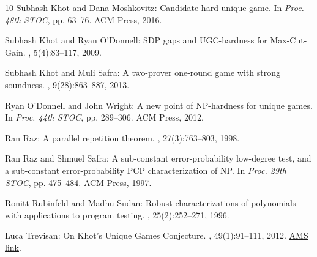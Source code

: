\documentclass[11pt]{article}
\numberwithin{equation}{section}
\theoremstyle{definition}
\theoremstyle{plain}
\begin{document}
\begin{thebibliography}{10}
{\sc Subhash Khot and Dana Moshkovitz}: Candidate hard unique game.
\newblock In {\em Proc. 48th STOC}, pp. 63--76. ACM Press, 2016.
\newblock [\epfmtdoi{10.1145/2897518.2897531}]

{\sc Subhash Khot and Ryan O'Donnell}: {SDP} gaps and {UGC}-hardness for
  {Max-Cut-Gain}.
, 5(4):83--117, 2009.

{\sc Subhash Khot and Muli Safra}: A two-prover one-round game with strong
  soundness.
, 9(28):863--887, 2013.

{\sc Ryan O'Donnell and John Wright}: A new point of {NP}-hardness for unique
  games.
\newblock In {\em Proc. 44th STOC}, pp. 289--306. ACM Press, 2012.
\newblock [\epfmtdoi{10.1145/2213977.2214005}]

{\sc Ran Raz}: A parallel repetition theorem.
, 27(3):763--803, 1998.
\newblock [\epfmtdoi{10.1137/S0097539795280895}]

{\sc Ran Raz and Shmuel Safra}: A sub-constant error-probability low-degree
  test, and a sub-constant error-probability {PCP} characterization of {NP}.
\newblock In {\em Proc. 29th STOC}, pp. 475--484. ACM Press, 1997.
\newblock [\epfmtdoi{10.1145/258533.258641}]

{\sc Ronitt Rubinfeld and Madhu Sudan}: Robust characterizations of polynomials
  with applications to program testing.
, 25(2):252--271, 1996.
\newblock [\epfmtdoi{10.1137/S0097539793255151}]

{\sc Luca Trevisan}: On {Khot}'s {Unique Games Conjecture}.
, 49(1):91--111, 2012.
\newblock
  \href{https://www.ams.org/journals/bull/2012-49-01/S0273-0979-2011-01361-1/S0273-0979-2011-01361-1.pdf}{AMS
  link}.

\end{thebibliography}
\end{document}
